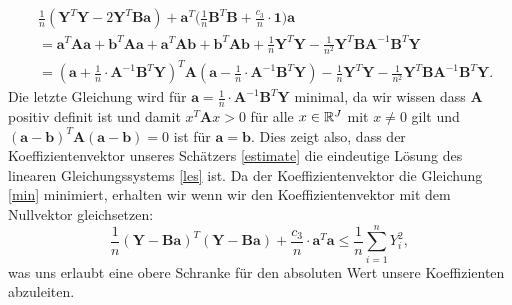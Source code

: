 \begin{equation*}
\begin{split}
& \frac{1}{n}(\mathbf{Y}^T\mathbf{Y} - 2\mathbf{Y}^T\mathbf{B}\mathbf{a}) + \mathbf{a}^T\bigg(\frac{1}{n} \mathbf{B}^T\mathbf{B} + \frac{c_3}{n} \cdot \mathbf{1}\bigg) \mathbf{a} \\
& = \mathbf{a}^T\mathbf{A}\mathbf{a} + \mathbf{b}^T\mathbf{A}\mathbf{a} + \mathbf{a}^T\mathbf{A}\mathbf{b} + \mathbf{b}^T\mathbf{A}\mathbf{b} + \frac{1}{n}\mathbf{Y}^T\mathbf{Y} - \frac{1}{n^2}\mathbf{Y}^T\mathbf{B}\mathbf{A}^{-1}\mathbf{B}^T\mathbf{Y} \\
& = (\mathbf{a} + \frac{1}{n} \cdot \mathbf{A}^{-1}\mathbf{B}^T\mathbf{Y})^T \mathbf{A} (\mathbf{a} - \frac{1}{n} \cdot \mathbf{A}^{-1} \mathbf{B}^T\mathbf{Y}) - \frac{1}{n}\mathbf{Y}^T\mathbf{Y} - \frac{1}{n^2}\mathbf{Y}^T\mathbf{B}\mathbf{A}^{-1}\mathbf{B}^T\mathbf{Y}.
\end{split} 
\end{equation*} 
Die letzte Gleichung wird für $\mathbf{a} = \frac{1}{n} \cdot \mathbf{A}^{-1}\mathbf{B}^T\mathbf{Y}$ minimal, 
da wir wissen dass $\mathbf{A}$ positiv definit ist und damit $x^T\mathbf{A}x > 0$ für alle $x \in \mathbb{R}^J$ mit $x \neq 0$ gilt und $(\mathbf{a} - \mathbf{b})^T\mathbf{A}(\mathbf{a} - \mathbf{b}) = 0$ ist für $\mathbf{a} = \mathbf{b}$. Dies zeigt also, dass der Koeffizientenvektor unseres Schätzers \ref{estimate} die eindeutige Lösung des linearen Gleichungssystems \ref{les} ist.
Da der Koeffizientenvektor die Gleichung \ref{min} minimiert, erhalten wir wenn wir den Koeffizientenvektor mit dem Nullvektor gleichsetzen$\colon$
$$\frac{1}{n}(\mathbf{Y} - \mathbf{B}\mathbf{a})^T(\mathbf{Y} - \mathbf{B}\mathbf{a}) + \frac{c_3}{n} \cdot \mathbf{a}^T\mathbf{a} \leq \frac{1}{n} \sum_{i = 1}^n Y_i^2,$$
was uns erlaubt eine obere Schranke für den absoluten Wert unsere Koeffizienten abzuleiten.


